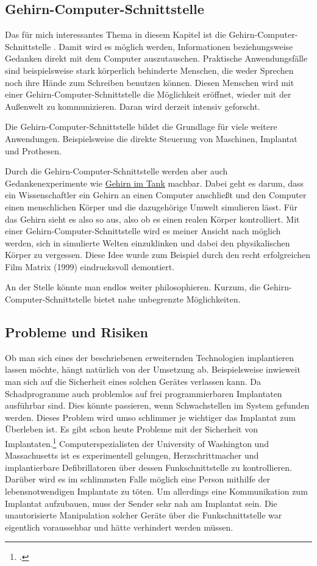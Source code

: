 \subsection{Gehirn-Computer-Schnittstelle}
\label{sec:Robin:future:BCI}
Das für mich interessantes Thema in diesem Kapitel ist die Gehirn-Computer-Schnittstelle
. Damit wird
es möglich werden, Informationen beziehungsweise Gedanken direkt mit dem Computer auszutauschen.
Praktische Anwendungsfälle sind beispielsweise stark körperlich behinderte Menschen, die weder
Sprechen noch ihre Hände zum Schreiben benutzen können. Diesen Menschen wird mit einer
Gehirn-Computer-Schnittstelle die Möglichkeit eröffnet, wieder mit der Außenwelt zu kommunizieren.
Daran wird derzeit intensiv geforscht.

Die Gehirn-Computer-Schnittstelle bildet die Grundlage für viele weitere Anwendungen. Beispielsweise
die direkte Steuerung von Maschinen, Implantat und Prothesen.

Durch die Gehirn-Computer-Schnittstelle werden aber auch Gedankenexperimente wie
\href{http://de.wikipedia.org/wiki/Gehirn_im_Tank}{Gehirn im Tank} machbar. Dabei geht es darum, dass
ein Wissenschaftler ein Gehirn an einen Computer anschließt und den Computer einen menschlichen
Körper und die dazugehörige Umwelt simulieren lässt. Für das Gehirn sieht es also so aus, also ob es
einen realen Körper kontrolliert. Mit einer Gehirn-Computer-Schnittstelle wird es meiner Ansicht nach
möglich werden, sich in simulierte Welten einzuklinken und dabei den physikalischen Körper zu
vergessen. Diese Idee wurde zum Beispiel durch den recht erfolgreichen Film Matrix (1999)
eindrucksvoll demontiert.

An der Stelle könnte man endlos weiter philosophieren. Kurzum, die Gehirn-Computer-Schnittstelle
bietet nahe unbegrenzte Möglichkeiten.

\subsection{Probleme und Risiken}
\label{sec:Robin:future:problems}
Ob man sich eines der beschriebenen erweiternden Technologien implantieren lassen möchte, hängt
natürlich von der Umsetzung ab. Beispielsweise inwieweit man sich auf die Sicherheit eines solchen
Gerätes verlassen kann. Da Schadprogramme auch problemlos auf frei programmierbaren Implantaten
ausführbar sind. Dies könnte passieren, wenn Schwachstellen im System gefunden werden. Dieses Problem
wird umso schlimmer je wichtiger das Implantat zum Überleben ist. Es gibt schon heute Probleme mit
der Sicherheit von Implantaten.\footcite{Heise:Pacemaker_Hacker, MIT:Protect_implants_from_attack}
Computerspezialisten der University of Washington und Massachusetts ist es experimentell gelungen,
Herzschrittmacher und implantierbare Defibrillatoren über dessen Funkschnittstelle zu kontrollieren.
Darüber wird es im schlimmsten Falle möglich eine Person mithilfe der lebensnotwendigen Implantate zu
töten. Um allerdings eine Kommunikation zum Implantat aufzubauen, muss der Sender sehr nah am
Implantat sein.
Die unautorisierte Manipulation solcher Geräte über die Funkschnittstelle war eigentlich voraussehbar
und hätte verhindert werden müssen.

